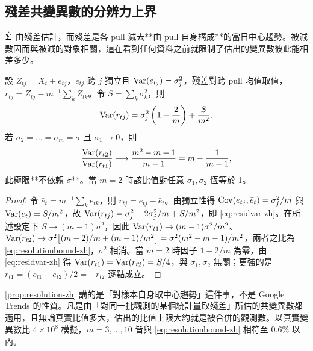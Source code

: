 \documentclass[12pt,a4paper,oneside]{article}
\begin{document}
\subsection{殘差共變異數的分辨力上界}\label{app:resolution-zh}

$\hat{\bm{\Sigma}}$ 由殘差估計，而殘差是各 pull 減去**由 pull 自身構成**的當日中心趨勢。被減數因而與被減的對象相關，這在看到任何資料之前就限制了估出的變異數彼此能相差多少。

\begin{proposition}[殘差共變異數的分辨力上界]
\label{prop:resolution-zh}
設 $Z_{tj}=X_t+e_{tj}$，$e_{tj}$ 跨 $j$ 獨立且 $\operatorname{Var}(e_{tj})=\sigma_j^2$，殘差對跨 pull 均值取值，$r_{tj}=Z_{tj}-m^{-1}\sum_k Z_{tk}$。令 $S=\sum_k\sigma_k^2$，則
\begin{equation}
\operatorname{Var}(r_{tj})=\sigma_j^2\left(1-\frac{2}{m}\right)+\frac{S}{m^2}.
\label{eq:residvar-zh}
\end{equation}
若 $\sigma_2=\dots=\sigma_m=\sigma$ 且 $\sigma_1\to 0$，則
\begin{equation}
\frac{\operatorname{Var}(r_{t2})}{\operatorname{Var}(r_{t1})}\longrightarrow
\frac{m^2-m-1}{m-1}=m-\frac{1}{m-1},
\label{eq:resolutionbound-zh}
\end{equation}
此極限**不依賴 $\sigma$**。當 $m=2$ 時該比值對任意 $\sigma_1,\sigma_2$ 恆等於 1。
\end{proposition}

\begin{proof}
令 $\bar{e}_t=m^{-1}\sum_k e_{tk}$，則 $r_{tj}=e_{tj}-\bar{e}_t$。由獨立性得 $\operatorname{Cov}(e_{tj},\bar{e}_t)=\sigma_j^2/m$ 與 $\operatorname{Var}(\bar{e}_t)=S/m^2$，故 $\operatorname{Var}(r_{tj})=\sigma_j^2-2\sigma_j^2/m+S/m^2$，即 \eqref{eq:residvar-zh}。在所述設定下 $S\to(m-1)\sigma^2$，因此 $\operatorname{Var}(r_{t1})\to(m-1)\sigma^2/m^2$、$\operatorname{Var}(r_{t2})\to\sigma^2\bigl[(m-2)/m+(m-1)/m^2\bigr]=\sigma^2(m^2-m-1)/m^2$，兩者之比為 \eqref{eq:resolutionbound-zh}，$\sigma^2$ 相消。當 $m=2$ 時因子 $1-2/m$ 為零，由 \eqref{eq:residvar-zh} 得 $\operatorname{Var}(r_{t1})=\operatorname{Var}(r_{t2})=S/4$，與 $\sigma_1,\sigma_2$ 無關；更強的是 $r_{t1}=(e_{t1}-e_{t2})/2=-r_{t2}$ 逐點成立。
\end{proof}

\begin{remark}[這個上界是關於什麼的]
\cref{prop:resolution-zh} 講的是「對樣本自身取中心趨勢」這件事，不是 Google Trends 的性質。凡是由「對同一批觀測的某個統計量取殘差」所估的共變異數都適用，且無論真實比值多大，估出的比值上限大約就是被合併的觀測數。以真實變異數比 $4\times 10^{8}$ 模擬，$m=3,\dots,10$ 皆與 \eqref{eq:resolutionbound-zh} 相符至 $0.6\%$ 以內。
\end{remark}
\end{document}
